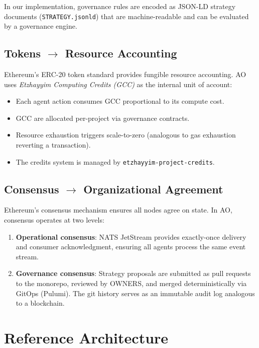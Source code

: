\documentclass[11pt,a4paper]{article}
\begin{document}
In our implementation, governance rules are encoded as JSON-LD strategy
documents (\texttt{STRATEGY.jsonld}) that are machine-readable and can be
evaluated by a governance engine.

\subsection{Tokens $\rightarrow$ Resource Accounting}

Ethereum's ERC-20 token standard provides fungible resource accounting. AO
uses \emph{Etzhayyim Computing Credits (GCC)} as the internal unit of account:

\begin{itemize}[nosep]
  \item Each agent action consumes GCC proportional to its compute cost.
  \item GCC are allocated per-project via governance contracts.
  \item Resource exhaustion triggers scale-to-zero (analogous to gas exhaustion
    reverting a transaction).
  \item The credits system is managed by \texttt{etzhayyim-project-credits}.
\end{itemize}

\subsection{Consensus $\rightarrow$ Organizational Agreement}

Ethereum's consensus mechanism ensures all nodes agree on state. In AO,
consensus operates at two levels:

\begin{enumerate}[nosep]
  \item \textbf{Operational consensus}: NATS JetStream provides exactly-once
    delivery and consumer acknowledgment, ensuring all agents process the
    same event stream.
  \item \textbf{Governance consensus}: Strategy proposals are submitted as
    pull requests to the monorepo, reviewed by OWNERS, and merged
    deterministically via GitOps (Pulumi). The git history serves as an
    immutable audit log analogous to a blockchain.
\end{enumerate}

\section{Reference Architecture}
\end{document}
